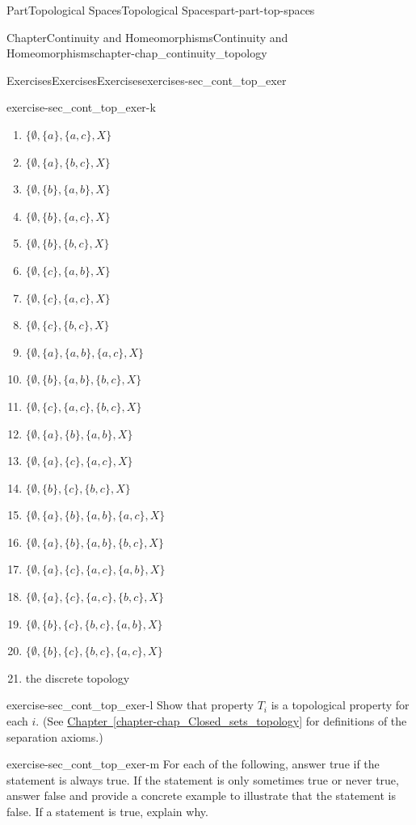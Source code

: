 \documentclass[oneside,10pt,]{book}
\newcommand{\xreffont}{\relax}
\numberwithin{equation}{chapter}
\begin{document}
\begin{partptx}{Part}{Topological Spaces}{}{Topological Spaces}{}{}{part-part-top-spaces}
\begin{chapterptx}{Chapter}{Continuity and Homeomorphisms}{}{Continuity and Homeomorphisms}{}{}{chapter-chap_continuity_topology}
\begin{exercises-section}{Exercises}{Exercises}{}{Exercises}{}{}{exercises-sec_cont_top_exer}
\begin{divisionexercise}{11}{}{}{exercise-sec_cont_top_exer-k}
\begin{enumerate}[font=\bfseries,label=(\alph*),ref=\alph*]
\item{}\(\{\emptyset, \{a\}, \{a,c\}, X\}\)%
\item{}\(\{\emptyset, \{a\}, \{b,c\}, X\}\)%
\item{}\(\{\emptyset, \{b\}, \{a,b\}, X\}\)%
\item{}\(\{\emptyset, \{b\}, \{a,c\}, X\}\)%
\item{}\(\{\emptyset, \{b\}, \{b,c\}, X\}\)%
\item{}\(\{\emptyset, \{c\}, \{a,b\}, X\}\)%
\item{}\(\{\emptyset, \{c\}, \{a,c\}, X\}\)%
\item{}\(\{\emptyset, \{c\}, \{b,c\}, X\}\)%
\item{}\(\{\emptyset, \{a\}, \{a,b\}, \{a,c\}, X\}\)%
\item{}\(\{\emptyset, \{b\}, \{a,b\}, \{b,c\}, X\}\)%
\item{}\(\{\emptyset, \{c\}, \{a,c\}, \{b,c\}, X\}\)%
\item{}\(\{\emptyset, \{a\}, \{b\}, \{a,b\}, X\}\)%
\item{}\(\{\emptyset, \{a\}, \{c\}, \{a,c\}, X\}\)%
\item{}\(\{\emptyset, \{b\}, \{c\}, \{b,c\}, X\}\)%
\item{}\(\{\emptyset, \{a\}, \{b\}, \{a,b\}, \{a,c\}, X\}\)%
\item{}\(\{\emptyset, \{a\}, \{b\}, \{a,b\}, \{b,c\}, X\}\)%
\item{}\(\{\emptyset, \{a\}, \{c\}, \{a,c\}, \{a,b\}, X\}\)%
\item{}\(\{\emptyset, \{a\}, \{c\}, \{a,c\}, \{b,c\}, X\}\)%
\item{}\(\{\emptyset, \{b\}, \{c\}, \{b,c\}, \{a,b\}, X\}\)%
\item{}\(\{\emptyset, \{b\}, \{c\}, \{b,c\}, \{a,c\}, X\}\)%
\item{}the discrete topology%
\end{enumerate}%
\end{divisionexercise}%
\begin{divisionexercise}{12}{}{}{exercise-sec_cont_top_exer-l}%
Show that property \(T_i\) is a topological property for each \(i\). (See \hyperref[chapter-chap_Closed_sets_topology]{Chapter~{\xreffont\ref{chapter-chap_Closed_sets_topology}}} for definitions of the separation axioms.)%
\end{divisionexercise}%
\begin{divisionexercise}{13}{}{}{exercise-sec_cont_top_exer-m}%
For each of the following, answer true if the statement is always true. If the statement is only sometimes true or never true, answer false and provide a concrete example to illustrate that the statement is false. If a statement is true, explain why.%

\end{divisionexercise}
\end{exercises-section}
\end{chapterptx}
\end{partptx}
\end{document}
